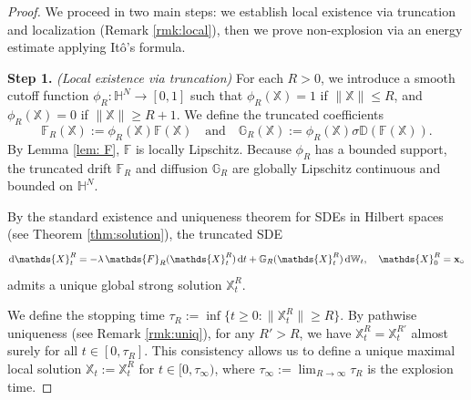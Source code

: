 \documentclass[12pt]{amsart}
\newcommand{\D}[1]{\mbox{\rm #1}}
\newcommand{\dd}{\D{d}}
\numberwithin{equation}{section}
\begin{document}
\begin{proof}
We proceed in two main steps: we establish local existence via truncation and localization (Remark \ref{rmk:local}), then we prove non-explosion via an energy estimate applying It\^o's formula.

\textbf{Step 1.} \textit{(Local existence via truncation)} 
For each $R > 0$, we introduce a smooth cutoff function $\phi_{R}: \mathbb{H}^{N} \to [0,1]$ such that $\phi_{R}(\mathds{X}) = 1$ if $\|\mathds{X}\| \leq R$, and $\phi_{R}(\mathds{X}) = 0$ if $\|\mathds{X}\| \geq R+1$. We define the truncated coefficients 
\begin{equation*}
    \mathds{F}_{R}(\mathds{X}) := \phi_{R}(\mathds{X})\mathds{F}(\mathds{X}) \quad \text{and} \quad \mathbb{G}_{R}(\mathds{X}) := \phi_{R}(\mathds{X})\sigma\mathbb{D}(\mathds{F}(\mathds{X})).
\end{equation*}
By Lemma \ref{lem: F}, $\mathds{F}$ is locally Lipschitz. Because $\phi_{R}$ has a bounded support, the truncated drift $\mathds{F}_{R}$ and diffusion $\mathbb{G}_{R}$ are globally Lipschitz continuous and bounded on $\mathbb{H}^{N}$. 

By the standard existence and uniqueness theorem for SDEs in Hilbert spaces (see Theorem \ref{thm:solution}), the truncated SDE
\begin{equation*}
    \dd \mathds{X}_{t}^{R} = -\lambda \, \mathds{F}_{R}(\mathds{X}_{t}^{R}) \, \dd t + \mathbb{G}_{R}(\mathds{X}_{t}^{R}) \, \dd \mathbb{W}_{t},\quad \mathds{X}_{0}^{R} = \mathbf{x}_{\circ}
\end{equation*}
admits a unique global strong solution $\mathds{X}_{t}^{R}$.

We define the stopping time $\tau_{R} := \inf\{t \geq 0 : \|\mathds{X}_{t}^{R}\| \geq R\}$. By pathwise uniqueness (see Remark \ref{rmk:uniq}), for any $R' > R$, we have $\mathds{X}_{t}^{R} = \mathds{X}_{t}^{R'}$ almost surely for all $t \in [0, \tau_{R}]$. This consistency allows us to define a unique maximal local solution $\mathds{X}_{t} := \mathds{X}_{t}^{R}$ for $t \in [0, \tau_{\infty})$, where $\tau_{\infty} := \lim_{R \to \infty} \tau_{R}$ is the explosion time.




\end{proof}
\end{document}
